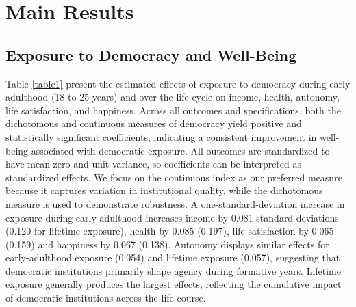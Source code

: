 \documentclass[11pt]{article}
\begin{document}
\section{Main Results}\label{Main}
\subsection{Exposure to Democracy and Well-Being}\label{Main1}

Table \ref{table1} present the estimated effects of exposure to democracy during early adulthood (18 to 25 years) and over the life cycle on income, health, autonomy, life satisfaction, and happiness. Across all outcomes and specifications, both the dichotomous and continuous measures of democracy yield positive and statistically significant coefficients, indicating a consistent improvement in well-being associated with democratic exposure. All outcomes are standardized to have mean zero and unit variance, so coefficients can be interpreted as standardized effects. We focus on the continuous index as our preferred measure because it captures variation in institutional quality, while the dichotomous measure is used to demonstrate robustness. A one-standard-deviation increase in exposure during early adulthood increases income by 0.081 standard deviations (0.120 for lifetime exposure), health by 0.085 (0.197), life satisfaction by 0.065 (0.159) and happiness by 0.067 (0.138). Autonomy displays similar effects for early-adulthood exposure (0.054) and lifetime exposure (0.057), suggesting that democratic institutions primarily shape agency during formative years. Lifetime exposure generally produces the largest effects, reflecting the cumulative impact of democratic institutions across the life course.
\end{document}
